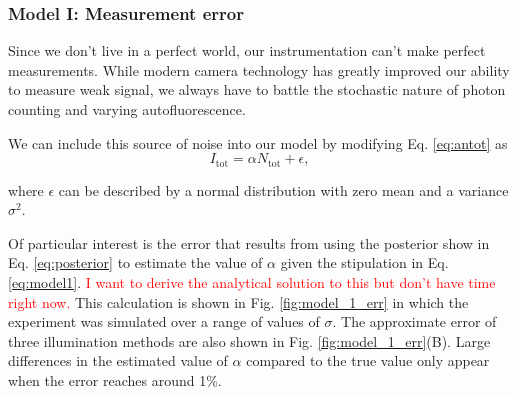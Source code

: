 \subsubsection*{Model I: Measurement error}

Since we don't live in a perfect world, our instrumentation can't make perfect
measurements. While modern camera technology has greatly improved our ability
to measure weak signal, we always have to battle the stochastic nature of photon
counting and varying autofluorescence.

We can include this source of noise into our model by modifying Eq. \ref{eq:antot}
as
\begin{equation}
  I_\text{tot} = \alpha N_\text{tot} + \epsilon,
  \label{eq:model1}
\end{equation}

where $\epsilon$ can be described by a normal distribution with zero mean and
a variance $\sigma^2$.

Of particular interest is the error that results from using the posterior show in Eq. \ref{eq:posterior}
to estimate the value of $\alpha$ given the stipulation in Eq. \ref{eq:model1}. {\textcolor{red}{I
want to derive the analytical solution to this but don't have time right now.}} This calculation
is shown in Fig. \ref{fig:model_1_err} in which the experiment was simulated over a range of values
of $\sigma$. The approximate error of three illumination methods are also shown in Fig. \ref{fig:model_1_err}(B). Large differences in the estimated value of $\alpha$ compared to the
true value only appear when the error reaches around 1\%.

\begin{figure}[h]
\end{figure}

